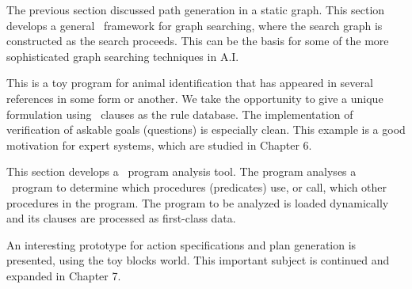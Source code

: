 
The previous section discussed path generation in a static graph. This section
develops a general \prolog\ framework for graph searching, where the search graph
is constructed as the search proceeds. This can be the basis for some of the
more sophisticated graph searching techniques in A.I.


This is a toy program for animal identification that has appeared in several
references in some form or another. We take the opportunity to give a unique
formulation using \prolog\ clauses as the rule database. The implementation of
verification of askable goals (questions) is especially clean. This example is a
good motivation for expert systems, which are studied in Chapter 6.


This section develops a \prolog\ program analysis tool. The program analyses a
\prolog\ program to determine which procedures (predicates) use, or call, which
other procedures in the program. The program to be analyzed is loaded
dynamically and its clauses are processed as first-class data.


An interesting prototype for action specifications and plan generation is
presented, using the toy blocks world. This important subject is continued and
expanded in Chapter 7.

